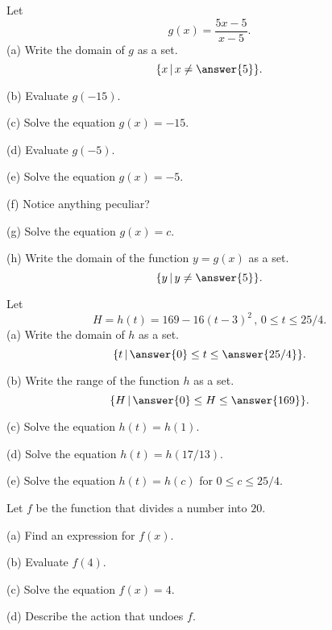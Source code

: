 \documentclass{ximera}
\begin{document}
\begin{question}  \label{Qdfr4545r443243}
Let
\[
        g(x) = \frac{5x-5}{x-5} . 
\]
(a) Write the domain of $g$ as a set.
\[
  \{ x \, | \, x \neq \answer{5} \}.
\]

(b) Evaluate $g(-15)$.

(c) Solve the equation $g(x)=-15$.

(d) Evaluate $g(-5)$.

(e) Solve the equation $g(x)=-5$.

(f) Notice anything peculiar?

(g) Solve the equation $g(x)=c$.

(h) Write the domain of the function $y=g(x)$ as a set.
\[
     \{ y \, | \, y \neq \answer{5} \}.
\]
\end{question}

\begin{question}  \label{Q9830449}
Let
\[
      H= h(t) = 169 - 16(t-3)^2 \, , \, 0\leq t \leq 25/4 .
\]
(a) Write the domain of $h$ as a set.
\[
  \{ t \, | \, \answer{0} \leq t \leq \answer{25/4} \}.
\]

(b) Write the range of the function $h$ as a set.
\[
    \{ H \, | \, \answer{0} \leq H \leq \answer{169} \}.
\]

(c) Solve the equation $h(t) = h(1)$.

(d) Solve the equation $h(t) = h(17/13)$.

(e) Solve the equation $h(t) = h(c)$ for $0\leq c \leq 25/4$.

\end{question}


\begin{question}  \label{Q7384fgrr}
Let $f$ be the function that divides a number into $20$.

(a) Find an expression for $f(x)$.

(b) Evaluate $f(4)$.

(c) Solve the equation $f(x)=4$.

(d) Describe the action that undoes $f$.

\end{question}
\end{document}
